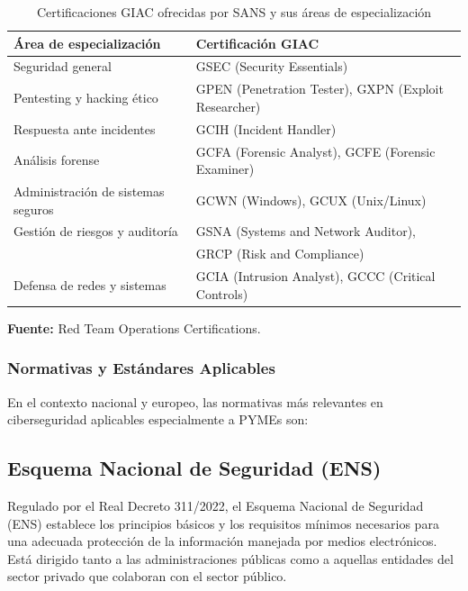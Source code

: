 \documentclass[a4paper, 11pt]{article}
\begin{document}
\begin{table}[H]
\centering
\caption{Certificaciones GIAC ofrecidas por SANS y sus áreas de especialización}
\begin{tabular}{|l|l|}
\hline
\textbf{Área de especialización} & \textbf{Certificación GIAC} \\
\hline
Seguridad general & GSEC (Security Essentials) \\
Pentesting y hacking ético & GPEN (Penetration Tester), GXPN (Exploit Researcher) \\
Respuesta ante incidentes & GCIH (Incident Handler) \\
Análisis forense & GCFA (Forensic Analyst), GCFE (Forensic Examiner) \\
Administración de sistemas seguros & GCWN (Windows), GCUX (Unix/Linux) \\
Gestión de riesgos y auditoría & GSNA (Systems and Network Auditor), \\
&GRCP (Risk and Compliance)\\
Defensa de redes y sistemas & GCIA (Intrusion Analyst), GCCC (Critical Controls) \\
\hline
\end{tabular}
\begin{flushleft}
\footnotesize \textbf{Fuente:} Red Team Operations Certifications. \cite{sanscert}

\end{flushleft}
\label{tab:giac-certificaciones}
\end{table}

\subsubsection{Normativas y Estándares Aplicables}

En el contexto nacional y europeo, las normativas más relevantes en ciberseguridad aplicables especialmente a PYMEs son:

\subsection*{Esquema Nacional de Seguridad (ENS)}

Regulado por el Real Decreto 311/2022, el Esquema Nacional de Seguridad (ENS) establece los principios básicos y los requisitos mínimos necesarios para una adecuada protección de la información manejada por medios electrónicos. Está dirigido tanto a las administraciones públicas como a aquellas entidades del sector privado que colaboran con el sector público.
\end{document}
